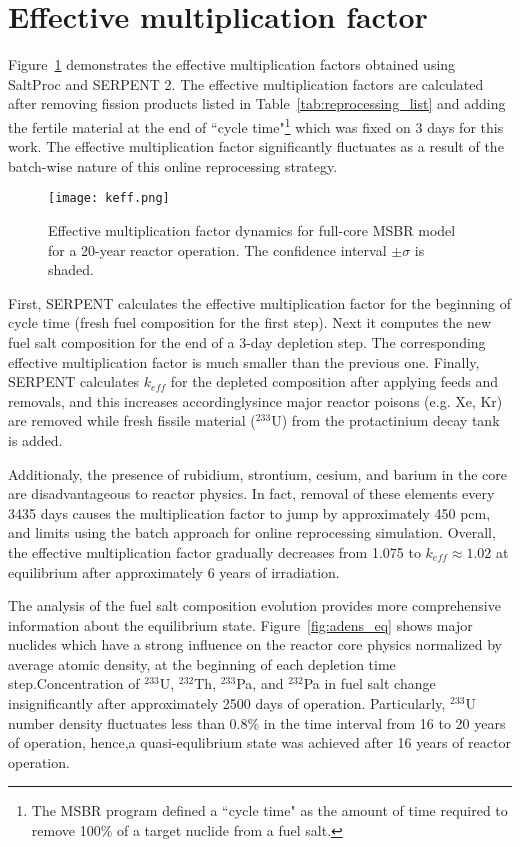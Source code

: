 \section{Effective multiplication factor}
Figure~\ref{fig:keff} demonstrates the effective multiplication factors obtained using SaltProc and SERPENT 2. The effective multiplication factors are calculated after removing fission products listed in Table~\ref{tab:reprocessing_list} and adding the fertile material at the end of ``cycle time"\footnote{The \gls{MSBR} program defined a ``cycle time" as the amount of time required to remove 100\% of a target nuclide from a fuel salt.} which was fixed on 3 days for this work. The effective multiplication factor significantly fluctuates as a result of the batch-wise nature of this online reprocessing strategy. 
\begin{figure}[hbp!] %
  \centering
  \vspace{-0.3em}
  \texttt{[image: keff.png]}
  \caption{Effective multiplication factor dynamics for full-core \gls{MSBR} model for a 20-year reactor operation. The confidence interval $\pm\sigma$ is shaded.}
  \vspace{-0.6em}
  \label{fig:keff}
\end{figure}
\FloatBarrier

First, SERPENT calculates the effective multiplication factor for the beginning of cycle time (fresh fuel composition for the first step). Next it computes the new fuel salt composition for the end of a 3-day depletion step. The corresponding effective multiplication factor is much smaller than the previous one. Finally, SERPENT calculates $k_{eff}$ for the depleted composition after applying feeds and removals, and this increases accordinglysince major reactor poisons (e.g. Xe, Kr) are removed while fresh fissile material ($^{233}$U) from the protactinium decay tank is added. 

Additionaly, the presence of rubidium, strontium, cesium, and barium in the core are disadvantageous to reactor physics. In fact, removal of these elements every 3435 days causes the multiplication factor to jump by approximately 450 pcm, and limits using the batch approach for online reprocessing simulation. Overall, the effective multiplication factor gradually decreases from 1.075 to $k_{eff} \approx 1.02$ at equilibrium after approximately 6 years of irradiation. 

The analysis of the fuel salt composition evolution provides more comprehensive information about the equilibrium state. Figure~\ref{fig:adens_eq} shows major nuclides which have a strong influence on the reactor core physics normalized by average atomic density, at the beginning of each depletion time step.Concentration of $^{233}$U, $^{232}$Th, $^{233}$Pa, and $^{232}$Pa in fuel salt change insignificantly after approximately 2500 days of operation. Particularly, $^{233}$U number density fluctuates less than 0.8\% in the time interval from 16 to 20 years of operation, hence,a quasi-equlibrium state was achieved after 16 years of reactor operation.

